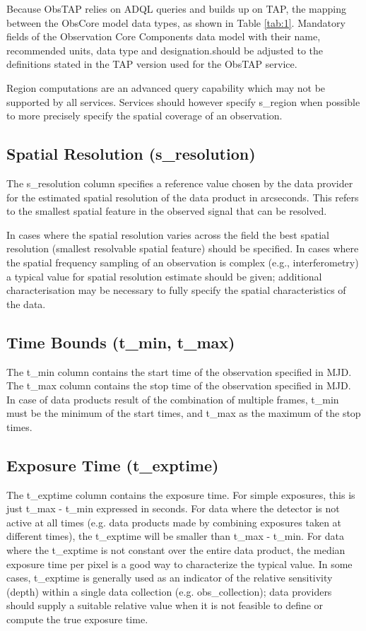 \documentclass[11pt,a4paper]{ivoa}
\begin{document}
Because ObsTAP relies on ADQL queries and builds up on TAP, the mapping between the ObsCore model data types, as shown
in Table \ref{tab:1}.  Mandatory fields of the Observation Core Components data model with their name, recommended units, data
type and designation.should be adjusted to the definitions stated in the TAP version used for the ObsTAP service.

Region computations are an advanced query capability which may not be supported by all services.  Services should
however specify s\_region when possible to more precisely specify the spatial coverage of an observation.

\subsection{Spatial Resolution (s\_resolution)}
The s\_resolution column specifies a reference value chosen by the data provider for the estimated spatial resolution of
the data product in arcseconds. This refers to the smallest spatial feature in the observed signal that can be
resolved.

In cases where the spatial resolution varies across the field the best spatial resolution (smallest resolvable spatial
feature) should be specified.  In cases where the spatial frequency sampling of an observation is complex (e.g.,
interferometry) a typical value for spatial resolution estimate should be given; additional characterisation may be
necessary to fully specify the spatial characteristics of the data.

\subsection{Time Bounds (t\_min, t\_max)}
\label{bkm:Ref285666427}The t\_min column contains the start time of the observation specified in MJD.  The t\_max
column contains the stop time of the observation specified in MJD.  In case of data products result of the combination
of multiple frames, t\_min must be the minimum of the start times, and t\_max as the maximum of the stop times.

\subsection{Exposure Time (t\_exptime)}
\label{bkm:Ref285666434}The t\_exptime column contains the exposure time.  For simple exposures, this is just t\_max -
t\_min expressed in seconds. For data where the detector is not active at all times (e.g. data products made by
combining exposures taken at different times), the t\_exptime will be smaller than t\_max - t\_min.  For data where the
t\_exptime is not constant over the entire data product, the median exposure time per pixel is a good way to
characterize the typical value. In some cases,  t\_exptime is generally used as an indicator of the relative
sensitivity (depth) within a single data collection (e.g. obs\_collection); data providers should supply a suitable
relative value when it is not feasible to define or compute the true exposure time.
\end{document}
